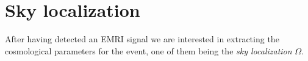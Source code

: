 \chapter{Sky localization}
After having detected an EMRI signal we are interested in extracting the cosmological parameters for the event, one of them being the \emph{sky localization} $\Omega$.